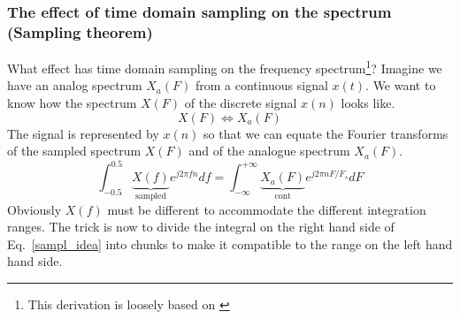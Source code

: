 \documentclass[12pt,a4paper]{article}
\begin{document}
\subsubsection{The effect of time domain sampling on the spectrum (Sampling
theorem)}
What effect has time domain sampling on the frequency spectrum\footnote{This derivation is loosely based on \citet{Proakis1996}}? Imagine we
have an analog spectrum $X_a(F)$ from a continuous signal $x(t)$. We want
to know how the spectrum $X(F)$ of the discrete signal $x(n)$ looks like.
\begin{equation}
X(F) \Leftrightarrow X_a(F)
\end{equation}
The signal is represented by $x(n)$ so that
we can equate the Fourier transforms of the sampled spectrum $X(F)$ and
of the analogue spectrum $X_a(F)$. 
\begin{equation}
\int_{-0.5}^{0.5} \underbrace{X(f)}_{\mbox{sampled}} e^{j 2 \pi f n} df = 
\int_{-\infty}^{+\infty} \underbrace{X_a(F)}_{\mbox{cont}} e^{j 2\pi n F/F_s} dF
\label{sampl_idea}
\end{equation}
Obviously $X(f)$ must be different to accommodate the different integration
ranges. The trick is now to divide the integral on the right hand side 
of Eq.~\ref{sampl_idea} 
into chunks to make it compatible to the range on the left hand
hand side.
\end{document}
